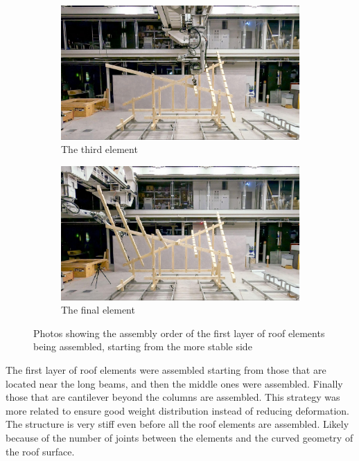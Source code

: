 \begin{figure}[!h]
    \centering
    \begin{subfigure}[b]{0.49\textwidth}
        \centering
        \includegraphics[width=\textwidth]{images/7b/img57.jpg}
        \caption{The third element}
    \end{subfigure}
    \hfill
    \begin{subfigure}[b]{0.49\textwidth}
        \centering
        \includegraphics[width=\textwidth]{images/7b/img58.jpg}
        \caption{The final element}
    \end{subfigure}
    \caption[Photos showing the assembly order of the first layer of roof elements in the HyparHut Pavilion]{Photos showing the assembly order of the first layer of roof elements being assembled, starting from the more stable side}
    \label{fig:order-first-layer-roof-elements}
\end{figure}

The first layer of roof elements were assembled starting from those that are located near the long beams, and then the middle ones were assembled. Finally those that are cantilever beyond the columns are assembled. This strategy was more related to ensure good weight distribution instead of reducing deformation. The structure is very stiff even before all the roof elements are assembled. Likely because of the number of joints between the elements and the curved geometry of the roof surface.

